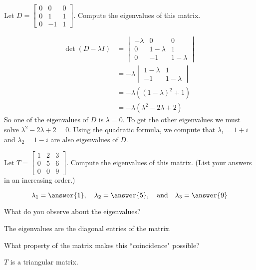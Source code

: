 \documentclass{ximera}
\begin{document}
\begin{example}\label{ex:3x3_complex_eig}
Let $D=\begin{bmatrix} 0&0&0\\ 0 &1&1\\ 0 & -1&1\end{bmatrix}$.  Compute the eigenvalues of this matrix.

\begin{explanation}
\begin{align*}\det(D-\lambda I)&=\begin{vmatrix} -\lambda&0&0\\ 0 &1-\lambda&1\\ 0 & -1&1-\lambda\end{vmatrix}\\
&=-\lambda\begin{vmatrix}1-\lambda&1\\-1&1-\lambda\end{vmatrix}\\
&=-\lambda((1-\lambda)^2+1)\\
&=-\lambda(\lambda^2-2\lambda+2)
\end{align*}
So one of the eigenvalues of $D$ is $\lambda=0$.  To get the other eigenvalues we must solve $\lambda^2-2\lambda+2=0$.  Using the quadratic formula, we compute that $\lambda_1=1+i$ and $\lambda_2=1-i$ are also eigenvalues of $D$.
\end{explanation}
\end{example}

\begin{exploration}\label{init:3x3tri}
Let $T=\begin{bmatrix} 1 & 2 & 3\\ 0 & 5 & 6\\ 0 & 0 & 9\end{bmatrix}$.  Compute the eigenvalues of this matrix.  (List your answers in an increasing order.)

$$\lambda_1=\answer{1},\quad\lambda_2=\answer{5},\quad\text{and}\quad\lambda_3=\answer{9}$$

What do you observe about the eigenvalues?
\begin{hint}
The eigenvalues are the diagonal entries of the matrix.
\end{hint}

What property of the matrix makes this ``coincidence" possible?

\begin{hint}
$T$ is a triangular matrix.
\end{hint}
\end{exploration}
\end{document}
